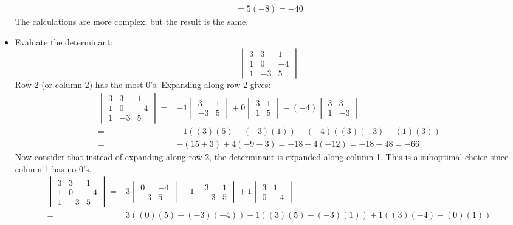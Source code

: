 \documentclass{article}
\begin{document}
\begin{itemize}
\begin{align*}
= 5(-8) = -40
\end{align*}
The calculations are more complex, but the result is the same.
\item Evaluate the determinant: 
\[\begin{vmatrix}
3 & 3 & 1 \\ 
1 & 0 & -4 \\ 
1 & -3 & 5
\end{vmatrix}\]
Row 2 (or column 2) has the most \(0\)'s. Expanding along row 2 gives:
\begin{align*}
\begin{vmatrix}
3 & 3 & 1 \\ 
1 & 0 & -4 \\ 
1 & -3 & 5
\end{vmatrix} = & -1\begin{vmatrix}
3 & 1 \\ 
-3 & 5
\end{vmatrix} + 0\begin{vmatrix}
3 & 1 \\ 
1 & 5
\end{vmatrix} - (-4)\begin{vmatrix}
3 & 3 \\ 
1 & -3 
\end{vmatrix} \\ 
= & -1((3)(5) - (-3)(1)) - (-4)((3)(-3) - (1)(3)) \\
= & -(15 + 3) + 4(-9 - 3) 
= -18 + 4(-12) 
= -18 - 48 = -66
\end{align*} 
Now consider that instead of expanding along row 2, the determinant is expanded along column 1. This is a suboptimal choice since column 1 has no \(0\)'s.  
\begin{align*}
\begin{vmatrix}
3 & 3 & 1 \\ 
1 & 0 & -4 \\ 
1 & -3 & 5
\end{vmatrix} = & 3\begin{vmatrix}
0 & -4 \\ 
-3 & 5
\end{vmatrix} - 1\begin{vmatrix}
3 & 1 \\ 
-3 & 5
\end{vmatrix} + 1\begin{vmatrix}
3 & 1 \\ 
0 & -4  
\end{vmatrix} \\ 
= & 3((0)(5) - (-3)(-4)) - 1((3)(5) - (-3)(1)) + 1((3)(-4) - (0)(1)) \\

\end{align*}
\end{itemize}
\end{document}
